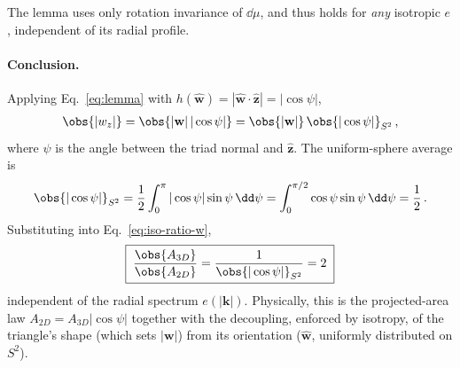 The lemma uses only rotation invariance of $\dd\mu$, and thus holds for \emph{any} isotropic $e$, independent of its radial profile.

\paragraph{Conclusion.}
Applying Eq.~\eqref{eq:lemma} with $h(\hat{\mathbf{w}})=|\hat{\mathbf{w}}\cdot\hat{\mathbf z}|=|\cos\psi|$,
\begin{align}
    \obs{|w_z|}=\obs{|\mathbf{w}|\,|\cos\psi|}=\obs{|\mathbf{w}|}\,\obs{|\cos\psi|}_{S^2}\,,
\end{align}
where $\psi$ is the angle between the triad normal and $\hat{\mathbf z}$. The uniform-sphere average is
\begin{align}
    \obs{|\cos\psi|}_{S^2}
    =\frac12\int_0^{\pi}|\cos\psi|\sin\psi\,\dd\psi
    =\int_0^{\pi/2}\cos\psi\sin\psi\,\dd\psi=\frac12\,.
\end{align}
Substituting into Eq.~\eqref{eq:iso-ratio-w},
\begin{align}
    \boxed{\;\frac{\obs{A_{3D}}}{\obs{A_{2D}}}
    =\frac{1}{\obs{|\cos\psi|}_{S^2}}=2\;}
\end{align}
independent of the radial spectrum $e(|\mathbf{k}|)$. Physically, this is the projected-area law $A_{2D}=A_{3D}|\cos\psi|$ together with the decoupling, enforced by isotropy, of the triangle's shape (which sets $|\mathbf{w}|$) from its orientation ($\hat{\mathbf{w}}$, uniformly distributed on $S^2$).
